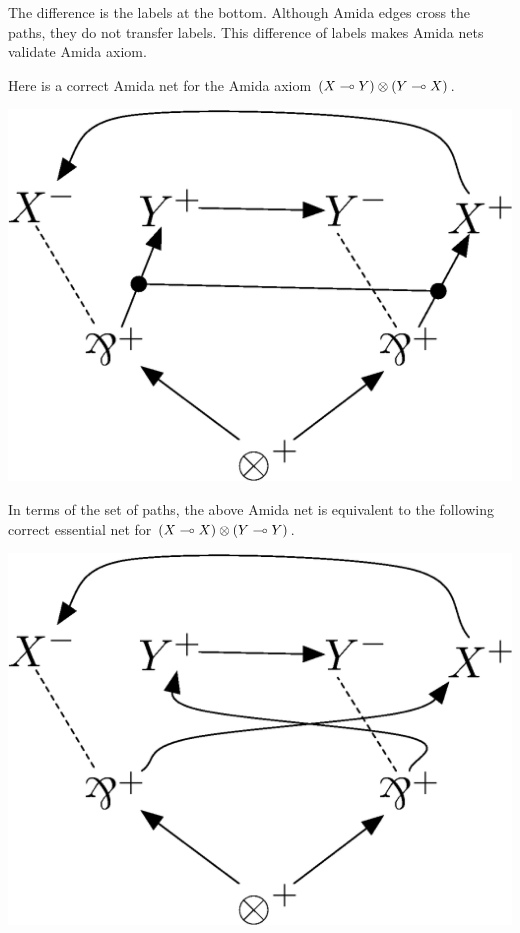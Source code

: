 The difference is the labels at the bottom.
Although Amida edges cross the paths,
they do not transfer labels.
This difference of labels makes Amida nets validate Amida axiom.
 \begin{example}
  Here is a correct Amida net for the Amida axiom $(X\multimap Y)\otimes(Y\multimap X)$.
   \begin{center}
    \includegraphics[scale=0.4]{amida-axiom.eps}
   \end{center}
  In terms of the set of paths, the above Amida net is equivalent to the
  following correct essential net for $(X\multimap X)\otimes (Y\multimap Y)$.
   \begin{center}
    \includegraphics[scale=0.4]{amida-axiom-cross.eps}
   \end{center}
 \end{example}

